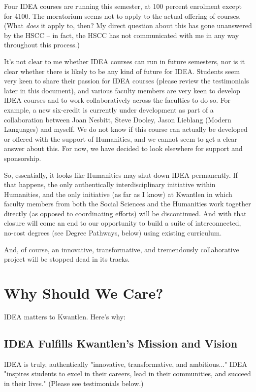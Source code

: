 \documentclass[letterpaper,10pt,headsepline]{scrreprt}
\begin{document}
Four IDEA courses are running this semester, at 100 percent enrolment except for 4100. The moratorium seems not to apply to the actual offering of courses. (What \textit{does} it apply to, then? My direct question about this has gone unanswered by the HSCC -- in fact, the HSCC has not communicated with me in any way throughout this process.)

It's not clear to me whether IDEA courses can run in future semesters, nor is it clear whether there is likely to be any kind of future for IDEA. Students seem very keen to share their passion for IDEA courses (please review the testimonials later in this document), and various faculty members are very keen to develop IDEA courses and to work collaboratively across the faculties to do so. For example, a new six-credit is currently under development as part of a collaboration between Joan Nesbitt, Steve Dooley, Jason Lieblang (Modern Languages) and myself. We do not know if this course can actually be developed or offered with the support of Humanities, and we cannot seem to get a clear answer about this. For now, we have decided to look elsewhere for support and sponsorship.

So, essentially, it looks like Humanities may shut down IDEA permanently. If that happens, the only authentically interdisciplinary initiative within Humanities, and the only initiative (as far as I know) at Kwantlen in which faculty members from both the Social Sciences and the Humanities work together directly (as opposed to coordinating efforts) will be discontinued. And with that closure will come an end to our opportunity to build a suite of interconnected, no-cost degrees (see Degree Pathways, below) using existing curriculum.

And, of course, an innovative, transformative, and tremendously collaborative project will be stopped dead in its tracks.


\section{Why Should We Care?}

IDEA matters to Kwantlen. Here's why:

\subsection{IDEA Fulfills Kwantlen's Mission and Vision}

IDEA is truly, authentically "innovative, transformative, and ambitious..." IDEA "inspires students to excel in their careers, lead in their communities, and succeed in their lives." (Please see testimonials below.)
\end{document}
